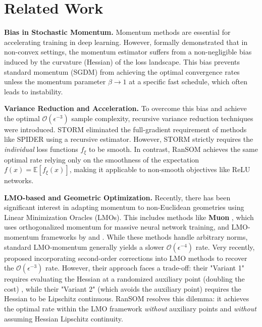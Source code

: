 \documentclass{article}
\theoremstyle{plain}
\theoremstyle{definition}
\theoremstyle{remark}
\begin{document}
\section{Related Work}
\label{sec:related_work}

\textbf{Bias in Stochastic Momentum.} 
Momentum methods are essential for accelerating training in deep learning. However, \citet{yuan2016convergence} formally demonstrated that in non-convex settings, the momentum estimator suffers from a non-negligible bias induced by the curvature (Hessian) of the loss landscape. This bias prevents standard momentum (SGDM) from achieving the optimal convergence rates unless the momentum parameter $\beta \to 1$ at a specific fast schedule, which often leads to instability.

\textbf{Variance Reduction and Acceleration.} 
To overcome this bias and achieve the optimal $\mathcal{O}(\epsilon^{-3})$ sample complexity, recursive variance reduction techniques were introduced. STORM \cite{cutkosky2019storm} eliminated the full-gradient requirement of methods like SPIDER \cite{fang2018spider} using a recursive estimator. However, STORM strictly requires the \textit{individual} loss functions $f_\xi$ to be smooth. In contrast, RanSOM achieves the same optimal rate relying only on the smoothness of the expectation $f(x) = \mathbb{E}[f_\xi(x)]$, making it applicable to non-smooth objectives like ReLU networks.

\textbf{LMO-based and Geometric Optimization.}
Recently, there has been significant interest in adapting momentum to non-Euclidean geometries using Linear Minimization Oracles (LMOs). This includes methods like \textbf{Muon} \cite{jordan2024muon}, which uses orthogonalized momentum for massive neural network training, and LMO-momentum frameworks by \citet{pethick2025training} and \citet{kovalev2025non}. While these methods handle arbitrary norms, standard LMO-momentum generally yields a slower $\mathcal{O}(\epsilon^{-4})$ rate. 
Very recently, \citet{khirirat2025better} proposed incorporating second-order corrections into LMO methods to recover the $\mathcal{O}(\epsilon^{-3})$ rate. However, their approach faces a trade-off: their "Variant 1" requires evaluating the Hessian at a randomized auxiliary point (doubling the cost) , while their "Variant 2" (which avoids the auxiliary point) requires the Hessian to be Lipschitz continuous. RanSOM resolves this dilemma: it achieves the optimal rate within the LMO framework \textit{without} auxiliary points and \textit{without} assuming Hessian Lipschitz continuity.
\end{document}
